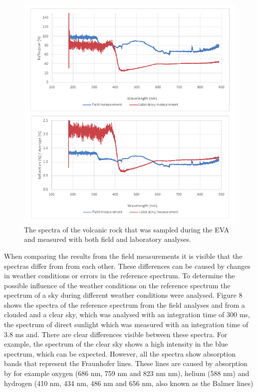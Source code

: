 \documentclass[preprint]{elsarticle}
\begin{document}
\begin{figure}
\centering
\includegraphics{img/figure07.png}
\caption{The spectra of the volcanic rock that was sampled during the EVA and measured with both field and laboratory analyses.}
\label{fig:f07}
\end{figure}

When comparing the results from the field measurements it is visible that the spectras differ from from each other. These differences can be caused by changes in weather conditions or errors in the reference spectrum. To determine the possible influence of the weather conditions on the reference spectrum the spectrum of a sky during different weather conditions were analysed. Figure 8 shows the spectra of the reference spectrum from the field analyses and from a clouded and a clear sky, which was analysed with an integration time of 300 ms, the spectrum of direct sunlight which was measured with an integration time of 3.8 ms and. There are clear differences visible between these spectra. For example, the spectrum of the clear sky shows a high intensity in the blue spectrum, which can be expected. However, all the spectra show absorption bands that represent the Fraunhofer lines. These lines are caused by absorption by for example oxygen (686 nm, 759 nm and 823 nm nm), helium (588 nm) and hydrogen (410 nm, 434 nm, 486 nm and 656 nm, also known as the Balmer lines)
\end{document}
